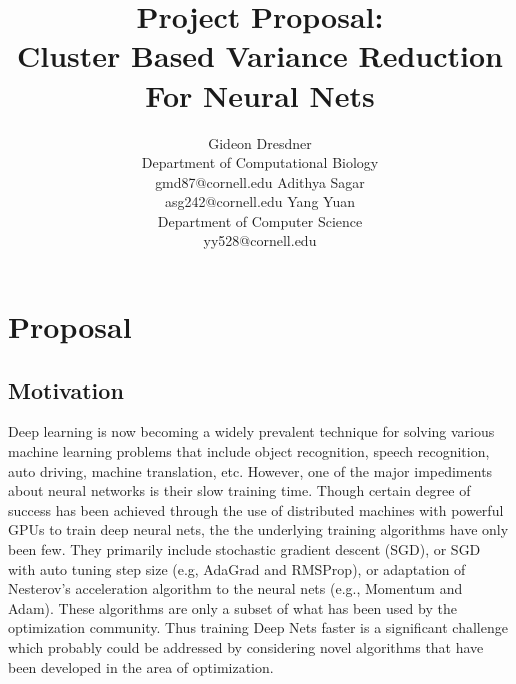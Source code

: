 \documentclass{article} %
\title{Project Proposal: \\Cluster Based Variance Reduction For Neural Nets}
\author{
Gideon Dresdner\\
Department of Computational Biology\\
gmd87@cornell.edu
\And
Adithya Sagar\\
asg242@cornell.edu
\And
Yang Yuan  \\
Department of Computer Science\\
yy528@cornell.edu
}
\begin{document}
\maketitle


\section{Proposal}
\subsection{Motivation}
Deep learning is now becoming a widely prevalent technique for solving various machine learning problems that include object recognition, speech recognition, auto driving, machine translation, etc. 
However, one of the major impediments about neural networks is their slow training time. Though certain degree of success has been achieved through the use of distributed machines with powerful GPUs to train deep neural nets, the the underlying training algorithms have only been few. They primarily include stochastic gradient descent (SGD), or SGD with auto tuning step size (e.g, AdaGrad and RMSProp), or adaptation of Nesterov's acceleration algorithm to the neural nets (e.g., Momentum and Adam). %
These algorithms are only a subset of what has been used by the optimization community. Thus training Deep Nets faster is a significant challenge which probably could be addressed by considering novel algorithms that have been developed in the area of optimization.  
\end{document}
